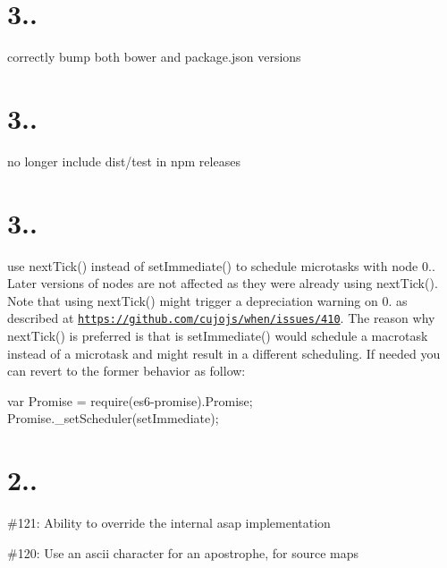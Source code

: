 \section*{3..}


\begin{DoxyItemize}
\item correctly bump both bower and package.\+json versions
\end{DoxyItemize}

\section*{3..}


\begin{DoxyItemize}
\item no longer include dist/test in npm releases
\end{DoxyItemize}

\section*{3..}


\begin{DoxyItemize}
\item use next\+Tick() instead of set\+Immediate() to schedule microtasks with node 0.. Later versions of nodes are not affected as they were already using next\+Tick(). Note that using next\+Tick() might trigger a depreciation warning on 0. as described at \href{https://github.com/cujojs/when/issues/410}{\tt https\+://github.\+com/cujojs/when/issues/410}. The reason why next\+Tick() is preferred is that is set\+Immediate() would schedule a macrotask instead of a microtask and might result in a different scheduling. If needed you can revert to the former behavior as follow\+:

var Promise = require(\textquotesingle{}es6-\/promise\textquotesingle{}).Promise; Promise.\+\_\+set\+Scheduler(set\+Immediate);
\end{DoxyItemize}

\section*{2..}


\begin{DoxyItemize}
\item \#121\+: Ability to override the internal asap implementation
\item \#120\+: Use an ascii character for an apostrophe, for source maps
\end{DoxyItemize}

